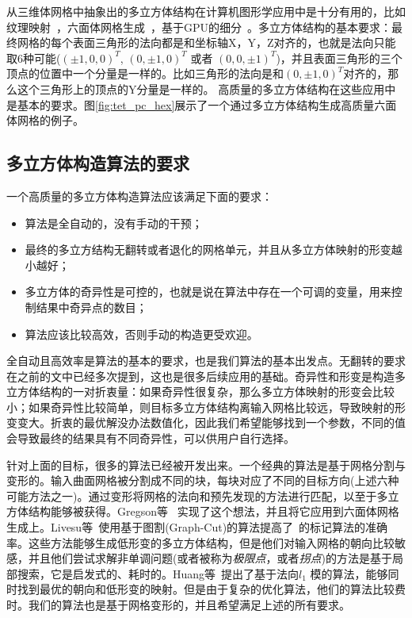 从三维体网格中抽象出的多立方体结构在计算机图形学应用中是十分有用的，比如纹理映射~\cite{Tarini2004,Yao2008,Chang2010}，六面体网格生成~\cite{Gregson2011}，基于GPU的细分~\cite{Xia2011}。多立方体结构的基本要求：最终网格的每个表面三角形的法向都是和坐标轴X，Y，Z对齐的，也就是法向只能取6种可能($(\pm 1,0,0)^T$, $(0,\pm 1,0)^T$ 或者 $(0,0,\pm 1)^T$)，并且表面三角形的三个顶点的位置中一个分量是一样的。比如三角形的法向是和$(0,\pm 1,0)^T$对齐的，那么这个三角形上的顶点的Y分量是一样的。
高质量的多立方体结构在这些应用中是基本的要求。图\ref{fig:tet_pc_hex}展示了一个通过多立方体结构生成高质量六面体网格的例子。
\subsection{多立方体构造算法的要求}
一个高质量的多立方体构造算法应该满足下面的要求：
\begin{itemize}
    \item 算法是全自动的，没有手动的干预；
    \item 最终的多立方结构无翻转或者退化的网格单元，并且从多立方体映射的形变越小越好；
    \item 多立方体的奇异性是可控的，也就是说在算法中存在一个可调的变量，用来控制结果中奇异点的数目；
    \item 算法应该比较高效，否则手动的构造更受欢迎。
\end{itemize}

全自动且高效率是算法的基本的要求，也是我们算法的基本出发点。无翻转的要求在之前的文中已经多次提到，这也是很多后续应用的基础。奇异性和形变是构造多立方体结构的一对折衷量：如果奇异性很复杂，那么多立方体映射的形变会比较小；如果奇异性比较简单，则目标多立方体结构离输入网格比较远，导致映射的形变变大。折衷的最优解没办法数值化，因此我们希望能够找到一个参数，不同的值会导致最终的结果具有不同奇异性，可以供用户自行选择。

针对上面的目标，很多的算法已经被开发出来。一个经典的算法是基于网格分割与变形的。输入曲面网格被分割成不同的块，每块对应了不同的目标方向(上述六种可能方法之一)。通过变形将网格的法向和预先发现的方法进行匹配，以至于多立方体结构能够被获得。Gregson等~\cite{Gregson2011} 实现了这个想法，并且将它应用到六面体网格生成上。Livesu等~\cite{Livesu2013}使用基于图割(Graph-Cut)的算法提高了~\cite{Gregson2011}的标记算法的准确率。这些方法能够生成低形变的多立方体结构，但是他们对输入网格的朝向比较敏感，并且他们尝试求解非单调问题(或者被称为\emph{极限点}，或者\emph{拐点})的方法是基于局部搜索，它是启发式的、耗时的。Huang等~\cite{Huang2014}提出了基于法向$l_1$ 模的算法，能够同时找到最优的朝向和低形变的映射。但是由于复杂的优化算法，他们的算法比较费时。我们的算法也是基于网格变形的，并且希望满足上述的所有要求。

